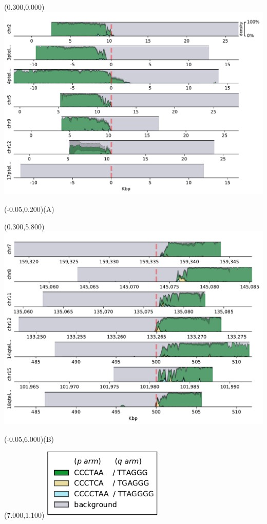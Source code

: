 \documentclass{article}
\begin{document}
\begin{textblock}{13}(0.300,0.000)\includegraphics{Figure_2/densityplot-p_arm.pdf}\end{textblock}
\begin{textblock}{13}(-0.05,0.200)\LARGE{(A)}\end{textblock}
\begin{textblock}{13}(0.300,5.800)\includegraphics{Figure_2/densityplot-q_arm.pdf}\end{textblock}
\begin{textblock}{13}(-0.05,6.000)\LARGE{(B)}\end{textblock}
\begin{textblock}{13}(7.000,1.100)\includegraphics[width=2.30in,keepaspectratio]{Figure_2/densityplot-legend.pdf}\end{textblock}
\end{document}
